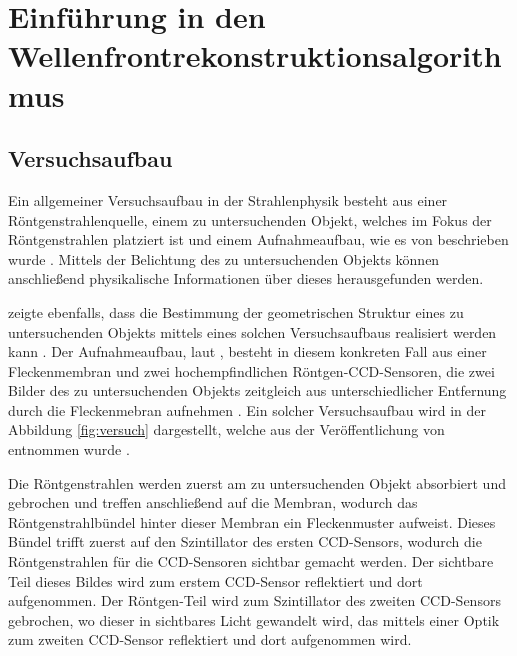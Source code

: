 \section{Einführung in den Wellenfrontrekonstruktionsalgorithmus}

\subsection{Versuchsaufbau}

Ein allgemeiner Versuchsaufbau in der Strahlenphysik besteht aus einer Röntgenstrahlenquelle, einem zu untersuchenden Objekt, welches im Fokus der Röntgenstrahlen platziert ist und einem Aufnahmeaufbau, wie es von \citeauthor{Ber13} beschrieben wurde . Mittels der Belichtung des zu untersuchenden Objekts können anschließend physikalische Informationen über dieses herausgefunden werden.

\citeauthor{Ber13} zeigte ebenfalls, dass die Bestimmung der geometrischen Struktur eines zu untersuchenden Objekts mittels eines solchen Versuchsaufbaus realisiert werden kann . Der Aufnahmeaufbau, laut \citeauthor{Ber15}, besteht in diesem konkreten Fall aus einer Fleckenmembran und zwei hochempfindlichen Röntgen-\gls{CCD}-Sensoren, die zwei Bilder des zu untersuchenden Objekts zeitgleich aus unterschiedlicher Entfernung durch die Fleckenmebran aufnehmen . Ein solcher Versuchsaufbau wird in der Abbildung \ref{fig:versuch} dargestellt, welche aus der Veröffentlichung \cite{Ber15} von \citeauthor{Ber15} entnommen wurde \cite{Ber15}.

Die Röntgenstrahlen werden zuerst am zu untersuchenden Objekt absorbiert und gebrochen und treffen anschließend auf die Membran, wodurch das Röntgenstrahlbündel hinter dieser Membran ein Fleckenmuster aufweist. Dieses Bündel trifft zuerst auf den Szintillator des ersten \gls{CCD}-Sensors, wodurch die Röntgenstrahlen für die \gls{CCD}-Sensoren sichtbar gemacht werden. Der sichtbare Teil dieses Bildes wird zum erstem \gls{CCD}-Sensor reflektiert und dort aufgenommen. Der Röntgen-Teil wird zum Szintillator des zweiten \gls{CCD}-Sensors gebrochen, wo dieser in sichtbares Licht gewandelt wird, das mittels einer Optik zum zweiten \gls{CCD}-Sensor reflektiert und dort aufgenommen wird. 

